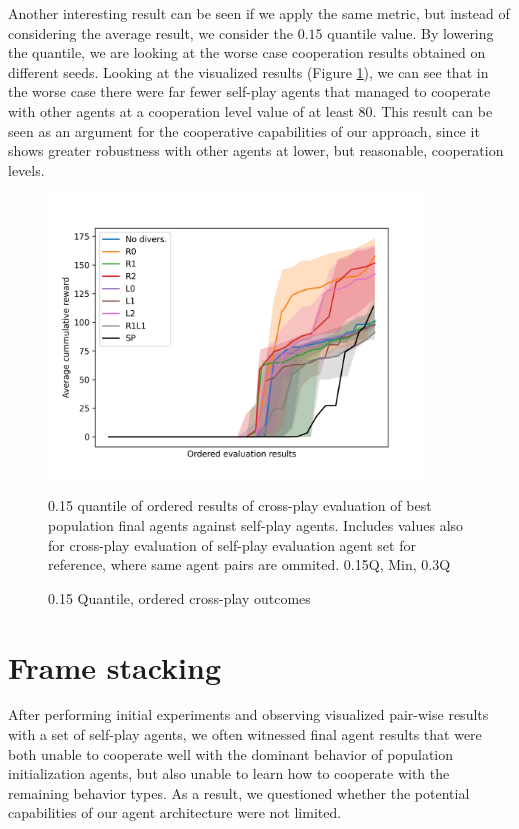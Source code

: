 Another interesting result can be seen if we apply the same metric, but instead of considering the average result, we consider the $0.15$ quantile value.
By lowering the quantile, we are looking at the worse case cooperation results obtained on different seeds.
Looking at the visualized results (Figure \ref{SimpleCNNOrderedAvg0.15Q}), we can see that in the worse case there were far fewer self-play agents that managed to cooperate with other agents at a cooperation level value of at least 80.
This result can be seen as an argument for the cooperative capabilities of our approach, since it shows greater robustness with other agents at lower, but reasonable, cooperation levels.



\begin{figure}[!ht]
    \centering
    \includegraphics*[width=10cm]{../img/SimpleCNNOrderedAvg0.15Q.png}

    \caption{0.15 Quantile, ordered cross-play outcomes}
    \label{SimpleCNNOrderedAvg0.15Q}
    \medskip
    \small 
    0.15 quantile of ordered results of cross-play evaluation of best population final agents against self-play agents.
    Includes values also for cross-play evaluation of self-play evaluation agent set for reference, where same agent pairs are ommited.
    0.15Q, Min, 0.3Q

\end{figure}

\newpage


\section{Frame stacking}
After performing initial experiments and observing visualized pair-wise results with a set of self-play agents, we often witnessed final agent results that were both unable to cooperate well with the dominant behavior of population initialization agents, but also unable to learn how to cooperate with the remaining behavior types.
As a result, we questioned whether the potential capabilities of our agent architecture were not limited.

